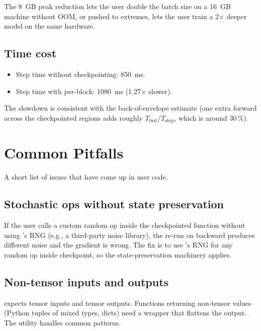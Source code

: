 The 8~GB peak reduction lets the user double the batch size on a
16~GB machine without OOM, or pushed to extremes, lets the user
train a 2$\times$ deeper model on the same hardware.

\subsection{Time cost}
\label{ssec:gradient_checkpointing:time_cost}

\begin{itemize}
  \item Step time without checkpointing: 850~ms.
  \item Step time with per-block: 1080~ms (1.27$\times$ slower).
\end{itemize}

The slowdown is consistent with the back-of-envelope estimate
(one extra forward across the checkpointed regions adds roughly
$T_{\text{fwd}} / T_{\text{step}}$, which is around 30\,\%).

\section{Common Pitfalls}
\label{sec:gradient_checkpointing:pitfalls}

A short list of issues that have come up in user code.

\subsection{Stochastic ops without state preservation}
\label{ssec:gradient_checkpointing:stoch_pitfall}

If the user calls a custom random op inside the checkpointed
function without using \Lucid's RNG (e.g., a third-party noise
library), the re-run on backward produces different noise and the
gradient is wrong. The fix is to use \Lucid's RNG for any random
op inside checkpoint, so the state-preservation machinery
applies.

\subsection{Non-tensor inputs and outputs}
\label{ssec:gradient_checkpointing:non_tensor}

 expects tensor inputs and tensor outputs.
Functions returning non-tensor values (Python tuples of mixed
types, dicts) need a wrapper that flattens the output. The
 utility handles common
patterns.

